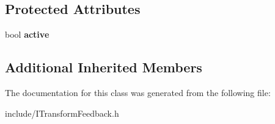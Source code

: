 \subsection*{Protected Attributes}
\begin{DoxyCompactItemize}
\item 
bool {\bfseries active}\hypertarget{classirr_1_1video_1_1ITransformFeedback_a5012ad2600086b6b0b32774ce220da1a}{}\label{classirr_1_1video_1_1ITransformFeedback_a5012ad2600086b6b0b32774ce220da1a}

\end{DoxyCompactItemize}
\subsection*{Additional Inherited Members}


The documentation for this class was generated from the following file\+:\begin{DoxyCompactItemize}
\item 
include/I\+Transform\+Feedback.\+h\end{DoxyCompactItemize}
